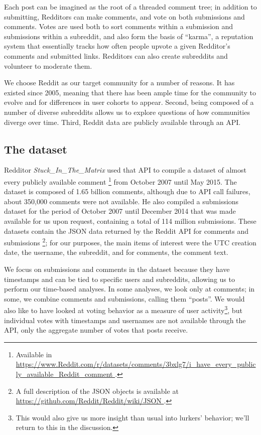 Each post can be imagined as the root of a threaded comment tree; in addition to submitting, Redditors can make comments, and vote on both submissions and comments.  Votes are used both to sort comments within a submission and submissions within a subreddit, and also form the basis of ``karma'', a reputation system that essentially tracks how often people upvote a given Redditor's comments and submitted links.  Redditors can also create subreddits and volunteer to moderate them.

We choose Reddit as our target community for a number of reasons.  It has existed since 2005, meaning that there has been ample time for the community to evolve and for differences in user cohorts to appear.  Second, being composed of a number of diverse subreddits allows us to explore questions of how communities diverge over time.  Third, Reddit data are publicly available through an API.

\subsection{The dataset}

Redditor \textit{Stuck\_In\_The\_Matrix} used that API to compile a dataset of almost every publicly available comment \footnote{Available in \url{https://www.Reddit.com/r/datasets/comments/3bxlg7/i_have_every_publicly_available_Reddit_comment }.} from October 2007 until May 2015.  The dataset is composed of 1.65 billion comments, although due to API call failures, about 350,000 comments were not available.  He also compiled a submissions dataset for the period of October 2007 until December 2014 that was made available for us upon request, containing a total of 114 million submissions.  These datasets contain the JSON data returned by the Reddit API for comments and submissions \footnote{A full description of the JSON objects is available at \url{https://github.com/Reddit/Reddit/wiki/JSON }.}; for our purposes, the main items of interest were the UTC creation date, the username, the subreddit, and for comments, the comment text.

We focus on submissions and comments in the dataset because they have timestamps and can be tied to specific users and subreddits, allowing us to perform our time-based analyses.   In some analyses, we look only at comments; in some, we combine comments and submissions, calling them ``posts''.  We would also like to have looked at voting behavior as a measure of user activity\footnote{This would also give us more insight than usual into lurkers' behavior; we'll return to this in the discussion.}, but individual votes with timestamps and usernames are not available through the API, only the aggregate number of votes that posts receive.

